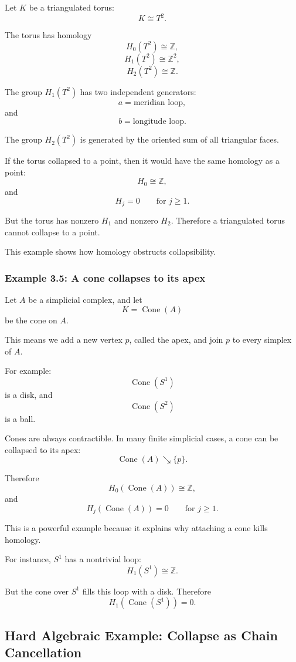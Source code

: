 \documentclass[12pt,a4paper]{article}
\theoremstyle{notespace}
\begin{document}
Let \(K\) be a triangulated torus:
\[
K\cong T^2.
\]

The torus has homology
\[
H_0(T^2)\cong \mathbb Z,
\]
\[
H_1(T^2)\cong \mathbb Z^2,
\]
\[
H_2(T^2)\cong \mathbb Z.
\]

The group \(H_1(T^2)\) has two independent generators:
\[
a=\text{meridian loop},
\]
and
\[
b=\text{longitude loop}.
\]

The group \(H_2(T^2)\) is generated by the oriented sum of all triangular faces.

If the torus collapsed to a point, then it would have the same homology as a point:
\[
H_0\cong \mathbb Z,
\]
and
\[
H_j=0
\qquad
\text{for }j\geq 1.
\]

But the torus has nonzero \(H_1\) and nonzero \(H_2\). Therefore a triangulated torus cannot collapse to a point.

This example shows how homology obstructs collapsibility.

\subsubsection{Example 3.5: A cone collapses to its apex}

Let \(A\) be a simplicial complex, and let
\[
K=\operatorname{Cone}(A)
\]
be the cone on \(A\).

This means we add a new vertex \(p\), called the apex, and join \(p\) to every simplex of \(A\).

For example:
\[
\operatorname{Cone}(S^1)
\]
is a disk, and
\[
\operatorname{Cone}(S^2)
\]
is a ball.

Cones are always contractible. In many finite simplicial cases, a cone can be collapsed to its apex:
\[
\operatorname{Cone}(A)\searrow \{p\}.
\]

Therefore
\[
H_0(\operatorname{Cone}(A))\cong \mathbb Z,
\]
and
\[
H_j(\operatorname{Cone}(A))=0
\qquad
\text{for }j\geq 1.
\]

This is a powerful example because it explains why attaching a cone kills homology.

For instance, \(S^1\) has a nontrivial loop:
\[
H_1(S^1)\cong \mathbb Z.
\]

But the cone over \(S^1\) fills this loop with a disk. Therefore
\[
H_1(\operatorname{Cone}(S^1))=0.
\]

\subsection{Hard Algebraic Example: Collapse as Chain Cancellation}
\end{document}
